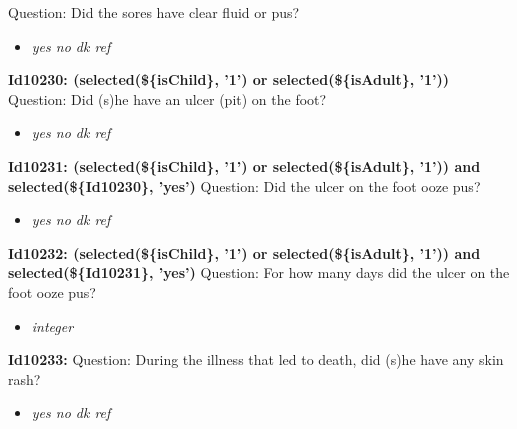 \documentclass{article}%
\begin{document}
Question: Did the sores have clear fluid or pus?\newline%
%
\begin{itemize}%
\item%
\textit{yes\newline%
 no\newline%
 dk\newline%
 ref\newline%
}%
\end{itemize}%
\textbf{Id10230: (selected(\$\{isChild\}, '1') or selected(\$\{isAdult\}, '1'))\newline%
}%
Question: Did (s)he have an ulcer (pit) on the foot?\newline%
%
\begin{itemize}%
\item%
\textit{yes\newline%
 no\newline%
 dk\newline%
 ref\newline%
}%
\end{itemize}%
\textbf{Id10231: (selected(\$\{isChild\}, '1') or selected(\$\{isAdult\}, '1')) and selected(\$\{Id10230\}, 'yes')\newline%
}%
Question: Did the ulcer on the foot ooze pus?\newline%
%
\begin{itemize}%
\item%
\textit{yes\newline%
 no\newline%
 dk\newline%
 ref\newline%
}%
\end{itemize}%
\textbf{Id10232: (selected(\$\{isChild\}, '1') or selected(\$\{isAdult\}, '1')) and selected(\$\{Id10231\}, 'yes')\newline%
}%
Question: For how many days did the ulcer on the foot ooze pus?\newline%
%
\begin{itemize}%
\item%
\textit{integer\newline%
}%
\end{itemize}%
\textbf{Id10233: \newline%
}%
Question: During the illness that led to death, did (s)he have any skin rash?\newline%
%
\begin{itemize}%
\item%
\textit{yes\newline%
 no\newline%
 dk\newline%
 ref\newline%
}%
\end{itemize}%
\end{document}
